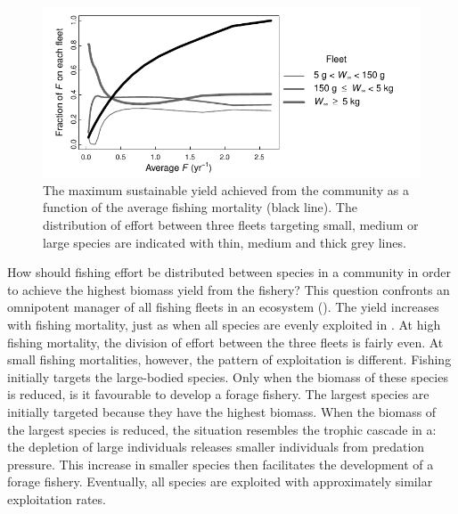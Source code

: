 \begin{figure}[t]
  \centering
  \includegraphics{ChapterCommunityFishing/communityMSY.pdf}
  \caption{The maximum sustainable yield achieved from the community as a function of the average fishing mortality (black line).  The distribution of effort between three fleets targeting small, medium or large species are indicated with thin, medium and thick grey lines. }
  \label{fig:communityMSY}
\end{figure}

How should fishing effort be distributed between species in a community in order to achieve the highest biomass yield from the fishery?  This question confronts an omnipotent manager of all fishing fleets in an ecosystem ().  The yield increases with fishing mortality, just as when all species are evenly exploited in .  At high fishing mortality, the division of effort between the three fleets is fairly even.  At small fishing mortalities, however, the pattern of exploitation is different.  Fishing initially targets the large-bodied species. Only when the biomass of these species is reduced, is it favourable to develop a forage fishery.  The largest species are initially targeted because they have the highest biomass.  When the biomass of the largest species is reduced, the situation resembles the trophic cascade in a: the depletion of large individuals releases smaller individuals from predation pressure.  This increase in smaller species then facilitates the development of a forage fishery.  Eventually, all species are exploited with approximately similar exploitation rates. 

